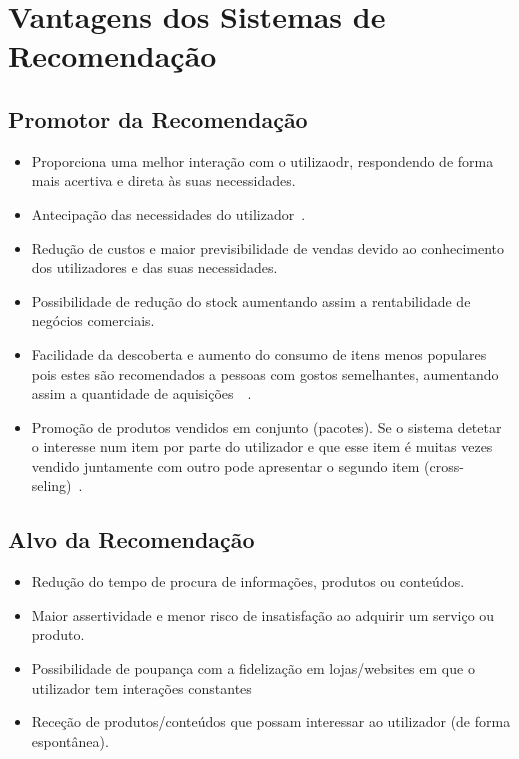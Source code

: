 \section{Vantagens dos Sistemas de Recomendação}

\subsection{Promotor da Recomendação}
\begin{itemize}
\item Proporciona uma melhor interação com o utilizaodr, respondendo de forma mais acertiva e direta às suas necessidades.
\item Antecipação das necessidades do utilizador~\cite{ref_book2}.
\item Redução de custos e maior previsibilidade de vendas devido ao conhecimento dos utilizadores e das suas necessidades.
\item Possibilidade de redução do stock aumentando assim a rentabilidade de negócios comerciais.
\item Facilidade da descoberta e aumento do consumo de itens menos populares pois estes são recomendados a pessoas com gostos semelhantes, aumentando assim a quantidade de aquisições~\cite{ref_book2}~\cite{ref_article1}.
\item Promoção de produtos vendidos em conjunto (pacotes). Se o sistema detetar o interesse num item por parte do utilizador e que esse item é muitas vezes vendido juntamente com outro pode apresentar o segundo item (cross-seling)~\cite{ref_book2}.
\end{itemize}


\subsection{Alvo da Recomendação}
\begin{itemize}
\item Redução do tempo de procura de informações, produtos ou conteúdos.
\item Maior assertividade e menor risco de insatisfação ao adquirir um serviço ou produto.
\item Possibilidade de poupança com a fidelização em lojas/websites em que o utilizador tem interações constantes
\item Receção de produtos/conteúdos que possam interessar ao utilizador (de forma espontânea).
\end{itemize}

